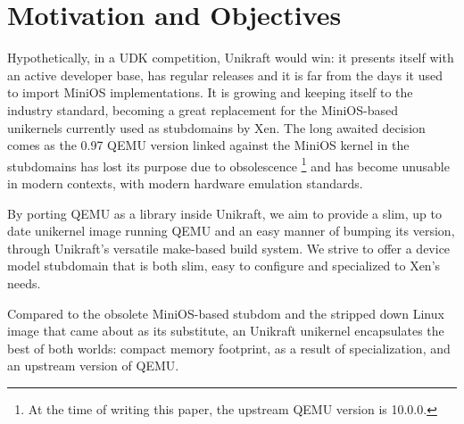 \chapter{Motivation and Objectives}
\label{chapter:motivation-objectives}

Hypothetically, in a UDK competition, Unikraft would win: it presents itself with an active developer base, has regular releases and it is far from the days it used to import MiniOS implementations.
It is growing and keeping itself to the industry standard, becoming a great replacement for the MiniOS-based unikernels currently used as stubdomains by Xen.
The long awaited decision comes as the 0.97 QEMU version linked against the MiniOS kernel in the stubdomains has lost its purpose due to obsolescence \footnote{At the time of writing this paper, the upstream QEMU version is 10.0.0.} and has become unusable in modern contexts, with modern hardware emulation standards.

By porting QEMU as a library inside Unikraft, we aim to provide a slim, up to date unikernel image running QEMU and an easy manner of bumping its version, through Unikraft's versatile make-based build system.
We strive to offer a device model stubdomain that is both slim, easy to configure and specialized to Xen's needs.

Compared to the obsolete MiniOS-based stubdom and the stripped down Linux image that came about as its substitute, an Unikraft unikernel encapsulates the best of both worlds: compact memory footprint, as a result of specialization, and an upstream version of QEMU.
